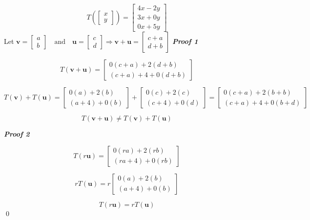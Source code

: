 \documentclass[letter,11pt]{article}
\begin{document}
\begin{tcolorbox}[boxrule=1mm, width=(.9\linewidth),before=\hfill,after=\hfill,adjusted title={Problem \# 6.ii Solutions}]
$$T\left(\begin{bmatrix}x \\ y\end{bmatrix}\right) = \begin{bmatrix} 4x-2y\\ 3x+0y\\0x+5y \end{bmatrix} $$
        Let $\boldsymbol{v} = \begin{bmatrix} a\\b \end{bmatrix}\quad \text{and} \quad \boldsymbol{u} = \begin{bmatrix} c\\d \end{bmatrix}\Longrightarrow \boldsymbol{v}+\boldsymbol{u} = \begin{bmatrix} c+a\\ d+b \end{bmatrix}$  
\tcblower
    \textbf{\textit{Proof 1}}
    
    $$T\left(\boldsymbol{v}+\boldsymbol{u}\right) = \begin{bmatrix} 0(c+a) + 2(d+b)\\ (c+a)+4+0(d+b) \end{bmatrix}$$

    $$T\left(\boldsymbol{v}\right)+T\left(\boldsymbol{u}\right) = \begin{bmatrix}0(a)+2(b)\\ (a+4)+0(b)\end{bmatrix} + \begin{bmatrix} 0(c)+2(c)\\ (c+4)+0(d) \end{bmatrix} = \begin{bmatrix}0(c+a)+2(b+b)\\ (c+a)+4+0(b+d)\end{bmatrix} $$
    
    $$T\left(\boldsymbol{v}+\boldsymbol{u}\right) \neq T\left(\boldsymbol{v}\right)+T\left(\boldsymbol{u}\right)$$ 
    
    \textbf{\textit{Proof 2}}
    
    $$T\left(r\boldsymbol{u}\right) =  \begin{bmatrix}0(ra)+2(rb)\\ (ra+4)+0(rb)\end{bmatrix} $$

    $$rT(\boldsymbol{u}) = r  \begin{bmatrix}0(a)+2(b)\\ (a+4)+0(b)\end{bmatrix}$$

     $$T\left(r\boldsymbol{u}\right) = rT(\boldsymbol{u})$$\qed
\end{tcolorbox}
\end{document}

